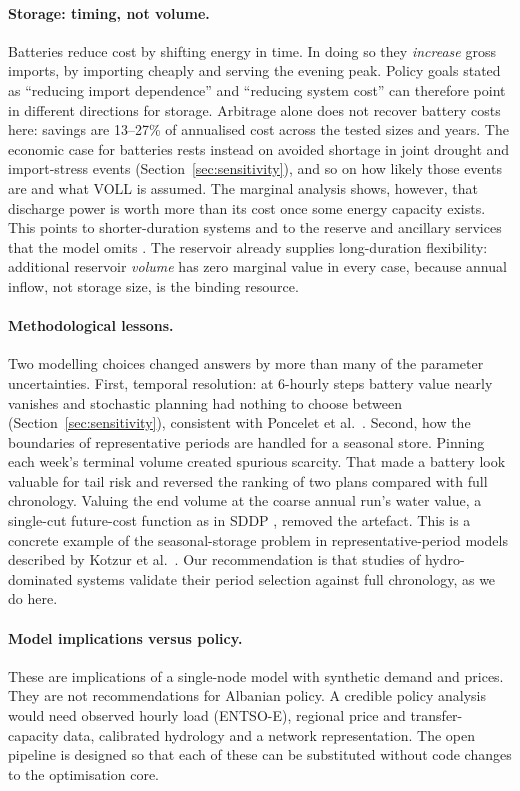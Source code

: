 \paragraph{Storage: timing, not volume.} Batteries reduce cost by shifting energy in time. In doing so they
\emph{increase} gross imports, by importing cheaply and serving the evening peak. Policy goals stated as
``reducing import dependence'' and ``reducing system cost'' can therefore point in different directions for
storage. Arbitrage alone does not recover battery costs here: savings are 13--27\% of annualised cost across the tested sizes and years. The
economic case for batteries rests instead on avoided shortage in joint drought and import-stress events
(Section~\ref{sec:sensitivity}), and so on how likely those events are and what VOLL is assumed.
The marginal analysis shows, however, that discharge power is worth more than its cost once some energy
capacity exists. This points to shorter-duration systems and to the reserve and ancillary services that the
model omits \cite{lund2015flexibility,kondziella2016flexibility}. The reservoir already supplies long-duration
flexibility: additional reservoir \emph{volume} has zero marginal value in every case, because annual inflow,
not storage size, is the binding resource.

\paragraph{Methodological lessons.} Two modelling choices changed answers by more than many of the parameter
uncertainties. First, temporal resolution: at 6-hourly steps battery value nearly vanishes and stochastic
planning had nothing to choose between (Section~\ref{sec:sensitivity}), consistent with
Poncelet et al.~\cite{poncelet2016temporal}. Second, how the boundaries of representative periods are handled
for a seasonal store. Pinning each week's terminal volume created spurious scarcity. That made a battery look
valuable for tail risk and reversed the ranking of two plans compared with full chronology. Valuing the end
volume at the coarse annual run's water value, a single-cut future-cost function as in SDDP
\cite{pereira1991sddp}, removed the artefact. This is a concrete example of the seasonal-storage problem in
representative-period models described by Kotzur et al.~\cite{kotzur2018seasonal}. Our recommendation is that
studies of hydro-dominated systems validate their period selection against full chronology, as we do here.

\paragraph{Model implications versus policy.} These are implications of a single-node model with synthetic
demand and prices. They are not recommendations for Albanian policy. A credible policy analysis would need
observed hourly load (ENTSO-E), regional price and transfer-capacity data, calibrated hydrology and a network
representation. The open pipeline is designed so that each of these can be substituted without code changes
to the optimisation core.
